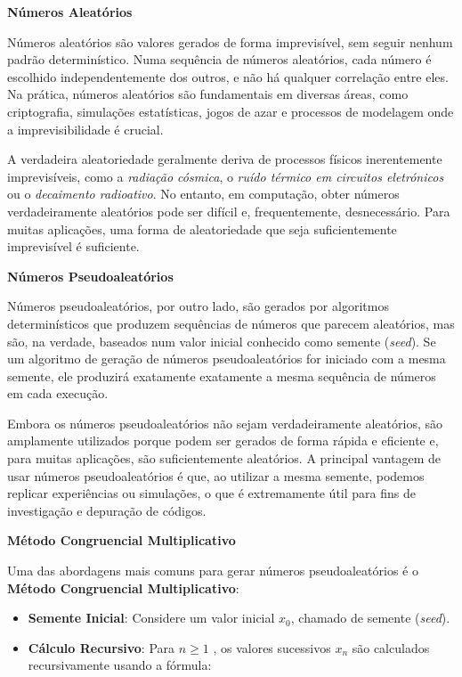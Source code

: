 \documentclass[
]{book}
\providecommand{\tightlist}{%
  \setlength{\itemsep}{0pt}\setlength{\parskip}{0pt}}
\begin{document}
\textbf{Números Aleatórios}

Números aleatórios são valores gerados de forma imprevisível, sem seguir
nenhum padrão determinístico. Numa sequência de números aleatórios, cada
número é escolhido independentemente dos outros, e não há qualquer
correlação entre eles. Na prática, números aleatórios são fundamentais
em diversas áreas, como criptografia, simulações estatísticas, jogos de
azar e processos de modelagem onde a imprevisibilidade é crucial.

A verdadeira aleatoriedade geralmente deriva de processos físicos
inerentemente imprevisíveis, como a \emph{radiação cósmica}, o \emph{ruído térmico em circuitos eletrónicos} ou o \emph{decaimento radioativo}. No entanto, em
computação, obter números verdadeiramente aleatórios pode ser difícil e,
frequentemente, desnecessário. Para muitas aplicações, uma forma de
aleatoriedade que seja suficientemente imprevisível é suficiente.

\textbf{Números Pseudoaleatórios}

Números pseudoaleatórios, por outro lado, são gerados por algoritmos
determinísticos que produzem sequências de números que parecem
aleatórios, mas são, na verdade, baseados num valor inicial conhecido
como semente (\emph{seed}). Se um algoritmo de geração de números
pseudoaleatórios for iniciado com a mesma semente, ele produzirá
exatamente exatamente a mesma sequência de números em cada execução.

Embora os números pseudoaleatórios não sejam verdadeiramente aleatórios,
são amplamente utilizados porque podem ser gerados de forma rápida e
eficiente e, para muitas aplicações, são suficientemente aleatórios. A
principal vantagem de usar números pseudoaleatórios é que, ao utilizar a
mesma semente, podemos replicar experiências ou simulações, o que é
extremamente útil para fins de investigação e depuração de códigos.

\textbf{Método Congruencial Multiplicativo}

Uma das abordagens mais comuns para gerar números pseudoaleatórios é o
\textbf{Método Congruencial Multiplicativo}:

\begin{itemize}
\tightlist
\item
  \textbf{Semente Inicial}: Considere um valor inicial \(x_0\), chamado de
  semente (\emph{seed}).
\item
  \textbf{Cálculo Recursivo}: Para \(n \geq 1\) , os valores sucessivos \(x_n\)
  são calculados recursivamente usando a fórmula:
\end{itemize}
\end{document}
